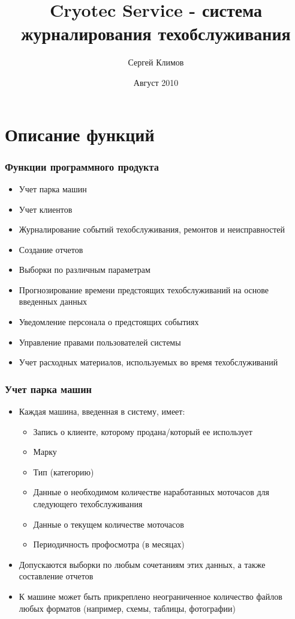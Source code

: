 \documentclass{beamer}
\title{Cryotec Service - система журналирования техобслуживания}
\author{Сергей Климов}
\date{Август 2010}
\begin{document}
\maketitle


\section{Описание функций}
\begin{frame}
\frametitle{Функции программного продукта}
	\begin{itemize}
		\item Учет парка машин
		\item Учет клиентов
		\item Журналирование событий техобслуживания, ремонтов и неисправностей
		\item Создание отчетов
		\item Выборки по различным параметрам
		\item Прогнозирование времени предстоящих техобслуживаний на основе введенных
		данных
		\item Уведомление персонала о предстоящих событиях
		\item Управление правами пользователей системы
		\item Учет расходных материалов, используемых во время техобслуживаний
	\end{itemize}
\end{frame}


\begin{frame}
\frametitle{Учет парка машин}
	\begin{itemize}
		\item Каждая машина, введенная в систему, имеет:
		\begin{itemize}
			\item Запись о клиенте, которому продана/который ее использует
			\item Марку
			\item Тип (категорию)
			\item Данные о необходимом количестве наработанных моточасов для следующего
			техобслуживания
			\item Данные о текущем количестве моточасов
			\item Периодичность профосмотра (в месяцах)
		\end{itemize}
		\item Допускаются выборки по любым сочетаниям этих данных, а также составление
	отчетов
		\item К машине может быть прикреплено неограниченное количество файлов любых
		форматов (например, схемы, таблицы, фотографии)
	\end{itemize}
\end{frame}
\end{document}

